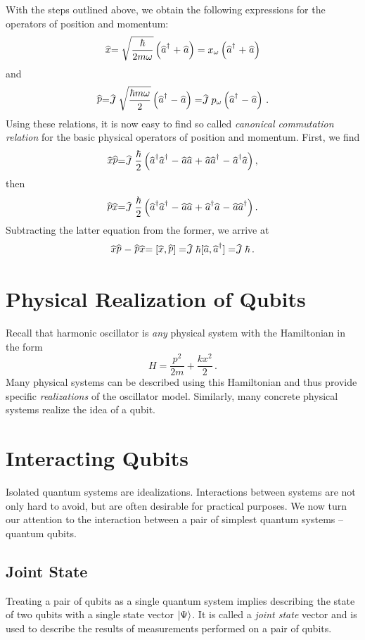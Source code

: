 With the steps outlined above, we obtain the following expressions for the operators of position and momentum:
\[
\op{x}=\sqrt{\frac{\hbar}{2m\omega}}\left(\op{a}^\dagger+\op{a}\right)=x_\omega\left(\op{a}^\dagger+\op{a}\right)
\]
and
\[
\op{p}=\op{J}\sqrt{\frac{\hbar m\omega}{2}}\left(\op{a}^\dagger-\op{a}\right)=\op{J} p_\omega\left(\op{a}^\dagger-\op{a}\right)\,.
\]
Using these relations, it is now easy to find so called \emph{canonical commutation relation} for the basic physical operators of position and momentum. First, we find
\[
\op{x}\op{p}=\op{J}\frac{\hbar}{2}\left(\op{a}^\dagger\op{a}^\dagger-\op{a}\op{a}+\op{a}\op{a}^\dagger-\op{a}^\dagger\op{a}\right),
\]
then
\[
\op{p}\op{x}=\op{J}\frac{\hbar}{2}\left(\op{a}^\dagger\op{a}^\dagger-\op{a}\op{a}+\op{a}^\dagger\op{a}-\op{a}\op{a}^\dagger\right).
\]
Subtracting the latter equation from the former, we arrive at
\[
\op{x}\op{p}-\op{p}\op{x}=\lbrack \op{x},\op{p}\rbrack=\op{J}\hbar\lbrack \op{a},\op{a}^\dagger\rbrack=\op{J}\hbar\,.
\]

\section{Physical Realization of Qubits}
Recall that harmonic oscillator is \emph{any} physical system with the Hamiltonian in the form
\[
H = \frac{p^2}{2m}+\frac{kx^2}{2}\,.
\] 
Many physical systems can be described using this Hamiltonian and thus provide specific \emph{realizations} of 
the oscillator model. Similarly, many concrete physical systems realize the idea of a qubit.

\section{Interacting Qubits}\label{sec:InteractingQubits}
Isolated quantum systems are idealizations. Interactions between systems are not only hard to  avoid, but are often desirable for practical purposes. We now turn our attention to the interaction between a pair of simplest quantum systems -- quantum qubits.

\subsection{Joint State}
Treating a pair of qubits as a single quantum system implies describing the state of two qubits with a single state vector $|{\Psi}\rangle$.  It is called a \emph{joint state} vector and is used to describe the results of  measurements performed on a pair of qubits.

